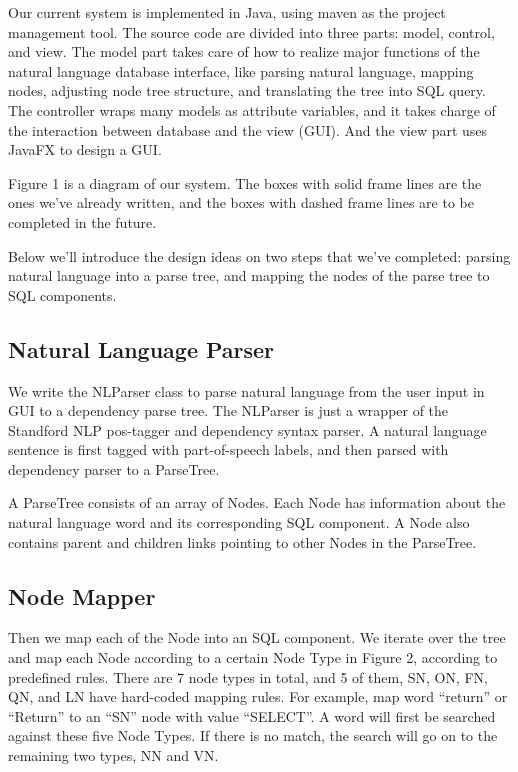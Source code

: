 \documentclass[twocolumn]{article}
\begin{document}
Our current system is implemented in Java, using maven as the project management tool. The source code are divided into three parts: model, control, and view. The model part takes care of how to realize major functions of the natural language database interface, like parsing natural language, mapping nodes, adjusting node tree structure, and translating the tree into SQL query. The controller wraps many models as attribute variables, and it takes charge of the interaction between database and the view (GUI). And the view part uses JavaFX to design a GUI.

Figure 1 is a diagram of our system. The boxes with solid frame lines are the ones we've already written, and the boxes with dashed frame lines are to be completed in the future. 

Below we’ll introduce the design ideas on two steps that we’ve completed: parsing natural language into a parse tree, and mapping the nodes of the parse tree to SQL components.

\subsection{Natural Language Parser}
We write the NLParser class to parse natural language from the user input in GUI to a dependency parse tree. The NLParser is just a wrapper of the Standford NLP pos-tagger and dependency syntax parser. A natural language sentence is first tagged with part-of-speech labels, and then parsed with dependency parser to a ParseTree.

A ParseTree consists of an array of Nodes. Each Node has information about the natural language word and its corresponding SQL component. A Node also contains parent and children links pointing to other Nodes in the ParseTree.

\subsection{Node Mapper}
Then we map each of the Node into an SQL component. We iterate over the tree and map each Node according to a certain Node Type in Figure 2, according to predefined rules. There are 7 node types in total, and 5 of them, SN, ON, FN, QN, and LN have hard-coded mapping rules. For example, map word “return” or “Return” to an “SN” node with value “SELECT”. A word will first be searched against these five Node Types. If there is no match, the search will go on to the remaining two types, NN and VN.
\end{document}

